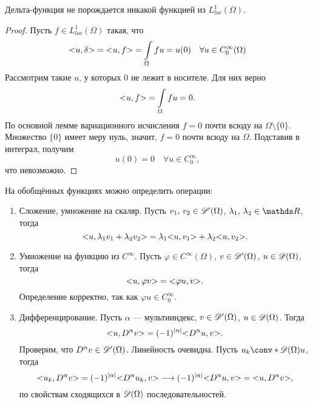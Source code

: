\begin{note}Дельта-функция не порождается никакой функцией из $L_{loc}^1(\Omega)$.
\end{note}
\begin{proof}
Пусть $f \in L_{loc}^1(\Omega)$ такая, что
$$ \action{u, \delta} = \action{u, f} = \int \limits_\Omega fu  = u(0) \quad \forall u \in C_0^{\infty}(\Omega)$$
Рассмотрим такие $u$, у которых $0$ не лежит в носителе. Для них верно
$$\action{u, f} = \int \limits_\Omega fu = 0.$$
По основной лемме вариационного исчисления $f = 0$ почти всюду на $\Omega \setminus \{0\}$. Множество $\{0\}$ имеет меру нуль, значит, $f = 0$ почти всюду на $\Omega$. Подставив в интеграл, получим
$$ u(0) = 0 \quad \forall u \in C_0^{\infty},$$
что невозможно.

\end{proof}

На обобщённых функциях можно определить операции:

\begin{enumerate}
\item Сложение, умножение на скаляр. Пусть $v_1, \, v_2 \in \mathscr{D}'(\Omega)$, $\lambda_1,\,\lambda_2 \in \real$, тогда
$$\action{u, \lambda_1v_1 + \lambda_2v_2} = \lambda_1\action{u, v_1} + \lambda_2\action{u, v_2}.$$
\item Умножение на функцию из $C^\infty$. Пусть $\varphi \in C^\infty(\Omega)$, $v\in \mathscr{D}'(\Omega)$, $u\in \mathscr{D}(\Omega)$, тогда
$$\action{u, \varphi v} = \action{\varphi u, v}.$$
Определение корректно, так как $\varphi u \in C_0^\infty$.
\item Дифференцирование. Пусть $\alpha$ --- мультииндекс, $v\in\mathscr{D}'(\Omega)$, $u \in \mathscr{D}(\Omega)$. Тогда
$$\action{u, D^\alpha v} = (-1)^{\abs{\alpha}}\action{D^\alpha u, v}.$$
Проверим, что $D^\alpha v\in \mathscr{D}'(\Omega)$. Линейность очевидна. Пусть $u_k \conv* {\beauD(\Omega)}{} u$, тогда
$$\action{u_k, D^\alpha v} = (-1)^{\abs{\alpha}} \action{D^\alpha u_k, v} \longrightarrow (-1)^{\abs{\alpha}} \action{D^\alpha u, v} = \action{u, D^\alpha v},$$
по свойствам сходящихся в $\mathscr{D}(\Omega)$ последовательностей.
\end{enumerate}

